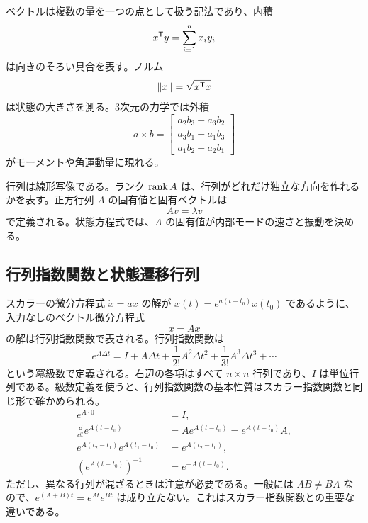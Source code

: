 ベクトルは複数の量を一つの点として扱う記法であり、内積
\begin{equation}
  x^{\mathsf{T}} y=\sum_{i=1}^{n}x_i y_i
\end{equation}
は向きのそろい具合を表す。ノルム
\begin{equation}
  \left\|x\right\|=\sqrt{x^{\mathsf{T}} x}
\end{equation}
は状態の大きさを測る。3次元の力学では外積
\begin{equation}
  a\times b=\begin{bmatrix}
    a_2b_3-a_3b_2\\ a_3b_1-a_1b_3\\ a_1b_2-a_2b_1
  \end{bmatrix}
\end{equation}
がモーメントや角運動量に現れる。

行列は線形写像である。ランク $\operatorname{rank} A$ は、行列がどれだけ独立な方向を作れるかを表す。正方行列 $A$ の固有値と固有ベクトルは
\begin{equation}
  Av=\lambda v
\end{equation}
で定義される。状態方程式では、$A$ の固有値が内部モードの速さと振動を決める。

\subsection{行列指数関数と状態遷移行列}

スカラーの微分方程式 $\dot{x}=ax$ の解が $x(t)=e^{a(t-t_0)}x(t_0)$ であるように、入力なしのベクトル微分方程式
\begin{equation}
  \dot{x}=Ax
\end{equation}
の解は行列指数関数で表される。行列指数関数は
\begin{equation}
  e^{A\Delta t}
  =I+A\Delta t+\frac{1}{2!}A^2\Delta t^2+\frac{1}{3!}A^3\Delta t^3+\cdots
  \label{eq:matrix-exponential-definition}
\end{equation}
という冪級数で定義される。右辺の各項はすべて $n\times n$ 行列であり、$I$ は単位行列である。級数定義を使うと、行列指数関数の基本性質はスカラー指数関数と同じ形で確かめられる。
\begin{align}
  e^{A\cdot 0}&=I,\\
  \frac{\dd}{\dd t}e^{A(t-t_0)}&=Ae^{A(t-t_0)}=e^{A(t-t_0)}A,\\
  e^{A(t_2-t_1)}e^{A(t_1-t_0)}&=e^{A(t_2-t_0)},\\
  \left(e^{A(t-t_0)}\right)^{-1}&=e^{-A(t-t_0)}.
\end{align}
ただし、異なる行列が混ざるときは注意が必要である。一般には $AB\ne BA$ なので、$e^{(A+B)t}=e^{At}e^{Bt}$ は成り立たない。これはスカラー指数関数との重要な違いである。

